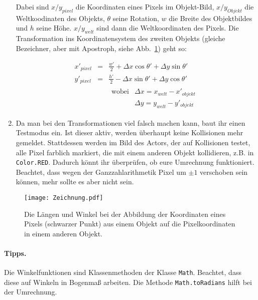 \documentclass{../pi-aufgabenblatt}
\begin{document}
\begin{enumerate}
Dabei sind $x/y_{pixel}$ die Koordinaten eines Pixels im Objekt-Bild, $x/y_{Objekt}$ die Weltkoodinaten des Objekts, $\theta$ seine Rotation, $w$ die Breite des Objektbildes und $h$ seine Höhe. $x/y_{welt}$ sind dann die Weltkoordinaten des Pixels. Die Transformation ins Koordinatensystem des zweiten Objekts (gleiche Bezeichner, aber mit Apostroph, siehe Abb.~\ref{f:transformation}) geht so:

$$
\begin{array}{rcl}
    x'_{pixel} & \!\!\! = \!\!\! & \frac {w'} 2 + \Delta x\cos\theta' + \Delta y \sin\theta' \\
    y'_{pixel} & \!\!\! = \!\!\! & \frac {h'} 2 - \Delta x\sin\theta' + \Delta y \cos\theta' \\
    && \!\!\! \begin{array}{ll}
        \mbox{wobei} & \Delta x = x_{welt} - x'_{objekt} \\
        & \Delta y = y_{welt} - y'_{objekt}
    \end{array}
\end{array}
$$

\item Da man bei den Transformationen viel falsch machen kann, baut ihr einen Testmodus ein. Ist dieser aktiv, werden überhaupt keine Kollisionen mehr gemeldet. Stattdessen werden im Bild des Actors, der auf Kollisionen testet, alle Pixel farblich markiert, die mit einem anderen Objekt kollidieren, z.B. in \texttt{Color.RED}. Dadurch könnt ihr überprüfen, ob eure Umrechnung funktioniert. Beachtet, dass wegen der Ganzzahlarithmetik Pixel um $\pm 1$ verschoben sein können, mehr sollte es aber nicht sein.

\end{enumerate}

\begin{figure}[b!]
\centering
\texttt{[image: Zeichnung.pdf]}
\caption{Die Längen und Winkel bei der Abbildung der Koordinaten eines Pixels (schwarzer Punkt) aus einem Objekt auf die Pixelkoordinaten in einem anderen Objekt.}
\label{f:transformation}
\end{figure}

\paragraph{Tipps.} Die Winkelfunktionen sind Klassenmethoden der Klasse \texttt{Math}. Beachtet, dass diese auf Winkeln in Bogenmaß arbeiten. Die Methode \texttt{Math.toRadians} hilft bei der Umrechnung.
\end{document}
